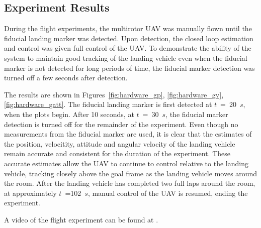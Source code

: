 
\subsection{Experiment Results}
During the flight experiments, the multirotor UAV was manually flown until the
fiducial landing marker was detected. Upon detection, the closed loop estimation
and control was given full control of the UAV. To demonstrate the ability of the
system to maintain good tracking of the landing vehicle even when the fiducial
marker is not detected for long periods of time, the fiducial marker detection
was turned off a few seconds after detection.

The results are shown in Figures~\ref{fig:hardware_gp}, \ref{fig:hardware_gv},
\ref{fig:hardware_gatt}. The fiducial landing marker is first detected at
$t$~=~20~$s$, when the plots begin. After 10 seconds, at $t$~=~30~$s$, the
fiducial marker detection is turned off for the remainder of the experiment.
Even though no measurements from the fiducial marker are used, it is clear that
the estimates of the position, velocitity, attitude and angular velocity of the
landing vehicle remain accurate and consistent for the duration of the
experiment. These accurate estimates allow
the UAV to continue to control relative to the landing vehicle, tracking closely
above the goal frame as the landing vehicle moves around the room. After the
landing vehicle has completed two full laps around the room,
at approximately $t$~=102~$s$, manual control of the UAV is resumed, ending the experiment.

A video of the flight experiment can be found at .



